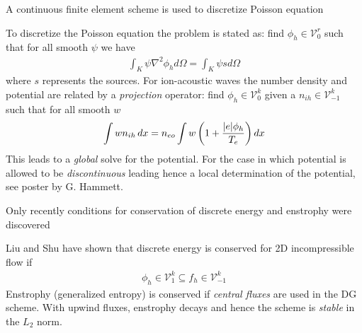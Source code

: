\documentclass[pdf]{beamer}
\theoremstyle{definition}
\begin{document}
\begin{frame}{A continuous finite element scheme is used to discretize
    Poisson equation}

  To discretize the Poisson equation the problem is stated as: find
  $\phi_h \in \mathcal{V}^r_0$ such that for all smooth $\psi$ we have
  \begin{align*}
    \int_K \psi \nabla^2 \phi_h d\Omega = \int_K \psi s d\Omega
  \end{align*}
  where $s$ represents the sources. For ion-acoustic waves the number
  density and potential are related by a \emph{projection} operator:
  find $\phi_h \in \mathcal{V}^k_0$ given a $n_{ih} \in
  \mathcal{V}_{-1}^k$ such that for all smooth $w$
  \begin{align*}
    \int w n_{ih}\thinspace dx = 
    n_{eo}\int w \left(1 + \frac{|e|\phi_h}{T_e}\right) dx
  \end{align*}
  This leads to a \emph{global} solve for the potential. For the case
  in which potential is allowed to be \emph{discontinuous} leading
  hence a local determination of the potential, see poster by
  G. Hammett.
\end{frame}

\begin{frame}{Only recently conditions for conservation of discrete
    energy and enstrophy were discovered}%

  Liu and Shu have shown that discrete
  energy is conserved for 2D incompressible flow if
  \begin{align*}
    \phi_h \in \mathcal{V}_1^k \subseteq f_h \in \mathcal{V}^k_{-1}
  \end{align*}
  Enstrophy (generalized entropy) is conserved if \emph{central
    fluxes} are used in the DG scheme. With upwind fluxes, enstrophy
  decays and hence the scheme is \emph{stable} in the $L_2$ norm.
\end{frame}
\end{document}
